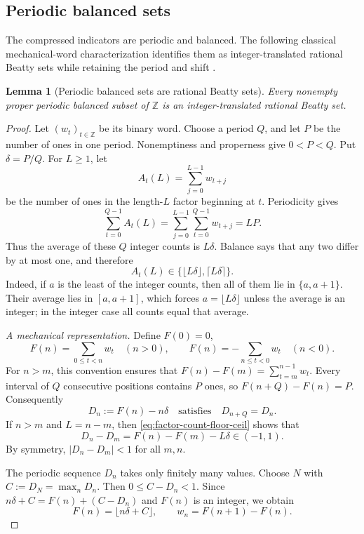 \documentclass[11pt]{article}
\newtheorem{lemma}[theorem]{Lemma}
\theoremstyle{definition}
\theoremstyle{remark}
\newcommand{\Z}{\mathbb Z}
\begin{document}
\subsection{Periodic balanced sets}

The compressed indicators are periodic and balanced.  The following
classical mechanical-word characterization identifies them as
integer-translated rational Beatty sets while retaining the period and shift
\cite[pp.~470--471]{TijdemanBalanced2000}.

\begin{lemma}[Periodic balanced sets are rational Beatty sets]
\label{lem:periodic-balanced}
Every nonempty proper periodic balanced subset of \(\Z\) is an
integer-translated rational Beatty set.
\end{lemma}

\begin{proof}
Let \((w_t)_{t\in\Z}\) be its binary word.  Choose a period \(Q\), and
let \(P\) be the number of ones in one period.  Nonemptiness and
properness give \(0<P<Q\).  Put \(\delta=P/Q\).  For \(L\ge1\), let
\[
 A_t(L)=\sum_{j=0}^{L-1}w_{t+j}
\]
be the number of ones in the length-\(L\) factor beginning at \(t\).
Periodicity gives
\[
 \sum_{t=0}^{Q-1}A_t(L)
 =\sum_{j=0}^{L-1}\sum_{t=0}^{Q-1}w_{t+j}=LP.
\]
Thus the average of these \(Q\) integer counts is \(L\delta\).  Balance
says that any two differ by at most one, and therefore
\begin{equation}\label{eq:factor-count-floor-ceil}
 A_t(L)\in\{\lfloor L\delta\rfloor,\lceil L\delta\rceil\}.
\end{equation}
Indeed, if \(a\) is the least of the integer counts, then all of them lie
in \(\{a,a+1\}\).  Their average lies in \([a,a+1]\), which forces
\(a=\lfloor L\delta\rfloor\) unless the average is an integer; in the
integer case all counts equal that average.

\smallskip
\noindent\emph{A mechanical representation.}
Define \(F(0)=0\),
\[
 F(n)=\sum_{0\le t<n}w_t\quad(n>0),\qquad
 F(n)=-\sum_{n\le t<0}w_t\quad(n<0).
\]
For \(n>m\), this convention ensures that
\(F(n)-F(m)=\sum_{t=m}^{n-1}w_t\).  Every interval of \(Q\) consecutive
positions contains \(P\) ones, so \(F(n+Q)-F(n)=P\).  Consequently
\[
 D_n:=F(n)-n\delta
 \quad\text{satisfies}\quad D_{n+Q}=D_n.
\]
If \(n>m\) and \(L=n-m\), then \eqref{eq:factor-count-floor-ceil}
shows that
\[
 D_n-D_m=F(n)-F(m)-L\delta\in(-1,1).
\]
By symmetry, \(|D_n-D_m|<1\) for all \(m,n\).

The periodic sequence \(D_n\) takes only finitely many values.  Choose
\(N\) with \(C:=D_N=\max_nD_n\).  Then \(0\le C-D_n<1\).  Since
\(n\delta+C=F(n)+(C-D_n)\) and \(F(n)\) is an integer, we obtain
\begin{equation}\label{eq:mechanical-floor}
 F(n)=\lfloor n\delta+C\rfloor,\qquad
 w_n=F(n+1)-F(n).
\end{equation}


\end{proof}
\end{document}
